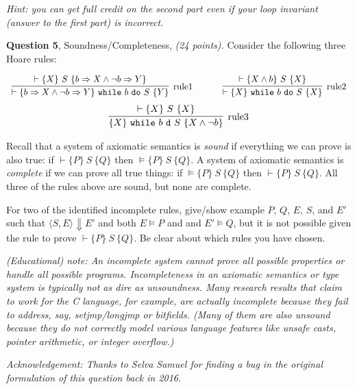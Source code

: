 \documentclass[11pt]{article}
\newcommand{\question}[3]
  {\bigskip \noindent
  {\bf Question #1}, {#2}, {\it(#3 points).}}
\begin{document}
\emph{Hint: you can get full credit on the second part even if your loop invariant (answer to the first part) is incorrect. }

\question{5}{Soundness/Completeness}{24}  Consider the following three Hoare rules:

\[
\begin{array}{ccc}
\infer[$rule1$]
{\vdash \{ b \Rightarrow X \wedge \neg b \Rightarrow Y \}~\mathtt{while}~b~\mathtt{do}~S~\{Y\}}
{\vdash \{ X \}~ S~ \{ b \Rightarrow X \wedge \neg b \Rightarrow Y \}} 
%
& ~~~~ &
%
\infer[$rule2$]{\vdash \{ X \}~ \mathtt{while}~b~\mathtt{do}~S~\{X \}}
{\vdash \{ X \wedge b \}~ S~ \{ X \} } \\
\end{array}
\]
\[
\begin{array}{c}
\infer[$rule3$]
{\{X \}~ \mathtt{while}~b~\mathtt{d}~S~\{X \wedge \neg b \}}
{\vdash \{ X \}~S~\{ X \}}
\end{array}
\]

 Recall that a system of axiomatic semantics is \emph{sound} if everything we can prove is also true: if $\vdash \{ P \}~S~\{ Q \}$ then $\vDash \{ P \}~S~\{ Q \}$.  A system of axiomatic semantics is \emph{complete} if we can prove all true things: if $\vDash \{ P \}~S~\{ Q \}$ then $\vdash \{ P \}~S ~\{ Q \}$.   All three of the rules above are sound, but none are complete.
 
\vspace{1em}
\noindent For two of the identified incomplete rules, give/show example $P$, $Q$, $E$, $S$, and $E'$ such that  $\langle S, E \rangle \Downarrow E'$  and both  $E \vDash P$ and and $E' \vDash Q$, but it is not possible given the rule to prove $\vdash \{P\}~S~\{Q\}$.  Be clear about which rules you have chosen.

\vspace{1em}
\textit{(Educational) note: An incomplete system cannot prove all possible properties or handle all possible programs. Incompleteness in an axiomatic semantics or type system is typically not as dire as unsoundness.  Many research results that claim to work for the C language, for example, are actually incomplete because they fail to address, say, setjmp/longjmp or bitfields. (Many of them are also unsound because they do not correctly model various language features like unsafe casts, pointer arithmetic, or integer overflow.)}

\vspace{1em}
\noindent \textit{Acknowledgement: Thanks to Selva Samuel for finding a bug in the original formulation of this question back in 2016.}
\end{document}
